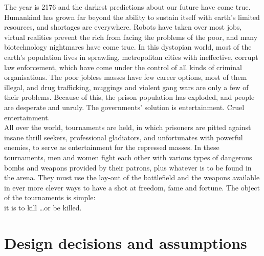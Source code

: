 \documentclass[a4paper,twoside,11pt]{article}
\begin{document}
   The year is 2176 and the darkest predictions about our future have come true. Humankind has grown far beyond the ability to sustain itself with earth's limited resources, and shortages are everywhere. Robots have taken over most jobs, virtual realities prevent the rich from facing the problems of the poor, and many biotechnology nightmares have come true. In this dystopian world, most of the earth's population lives in sprawling, metropolitan cities with ineffective, corrupt law enforcement, which have come under the control of all kinds of criminal organisations. The poor jobless masses have few career options, most of them illegal, and drug trafficking, muggings and violent gang wars are only a few of their problems. Because of this, the prison population has exploded, and people are desperate and unruly. The governments' solution is entertainment. Cruel entertainment. \\

    All over the world, tournaments are held, in which prisoners are pitted against insane thrill seekers, professional gladiators, and unfortunates with powerful enemies, to serve as entertainment for the repressed masses. In these tournaments, men and women fight each other with various types of dangerous bombs and weapons provided by their patrons, plus whatever is to be found in the arena. They must use the lay-out of the battlefield and the weapons available in ever more clever ways to have a shot at freedom, fame and fortune. The object of the tournaments is simple: \\ 

it is to kill \ldots or be killed.
 

%



\newpage
\section{Design decisions and assumptions}
\end{document}
